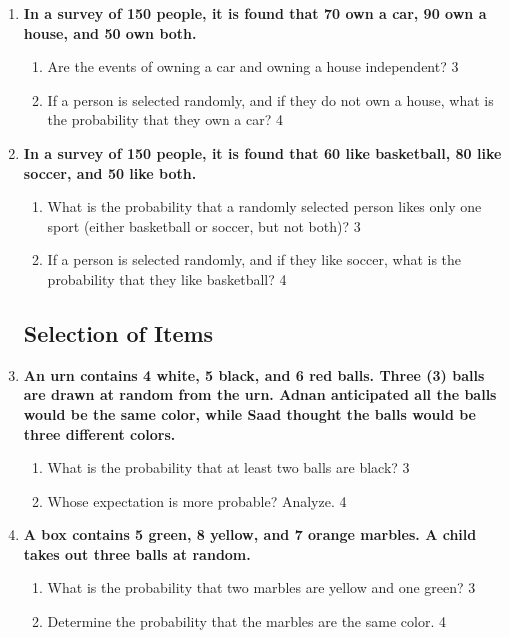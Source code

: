 \documentclass[a4paper,oneside, margin=1.4in]{book}
\begin{document}
\begin{enumerate}
\item  
  \textbf{In a survey of 150 people, it is found that 70 own a car, 90 own a house, and 50 own both.}  

  \begin{enumerate}  
    \item  
    	Are the events of owning a car and owning a house independent?  \hfill 3  
    \item  
    	If a person is selected randomly, and if they do not own a house, what is the probability that they own a car? \hfill 4  
  \end{enumerate}  
  
  \item  
  \textbf{In a survey of 150 people, it is found that 60 like basketball, 80 like soccer, and 50 like both.}  

  \begin{enumerate}  
    \item  
    	What is the probability that a randomly selected person likes only one sport (either basketball or soccer, but not both)? \hfill 3  
    \item  
    	If a person is selected randomly, and if they like soccer, what is the probability that they like basketball? \hfill 4  
  \end{enumerate}  


\subsection{Selection of Items}

 \item
	  \textbf{An urn contains 4 white, 5 black, and 6 red balls. Three (3) balls are drawn at random from the urn. Adnan anticipated all the balls would be the same color, while Saad thought the balls would be three different colors.} 
  
  \begin{enumerate}
    \item  
	What is the probability that at least two balls are black? \hfill 3
    \item
	Whose expectation is more probable? Analyze.  \hfill 4
  \end{enumerate}
  
   \item
	  \textbf{A box contains 5 green, 8 yellow, and 7 orange marbles. A child takes out three balls at random.} 
  
  \begin{enumerate}
    \item  
	What is the probability that two marbles are yellow and one green? \hfill 3
    \item
	Determine the probability that the marbles are the same color. \hfill 4
  \end{enumerate}
  

\end{enumerate}
\end{document}
